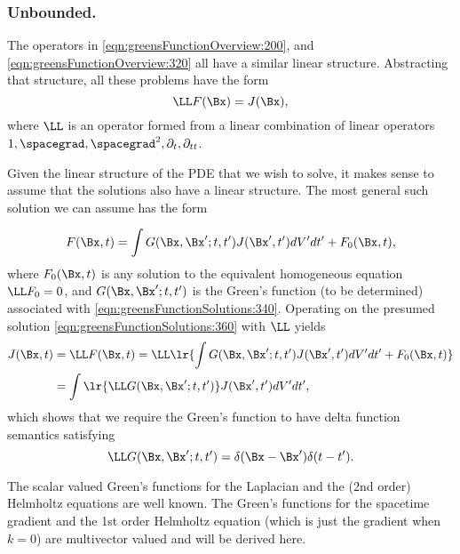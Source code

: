 %
%
\subsubsection{Unbounded.}

The operators in \cref{eqn:greensFunctionOverview:200}, and \cref{eqn:greensFunctionOverview:320} all have a similar linear structure.
Abstracting that structure, all these problems have the form
\begin{equation}\label{eqn:greensFunctionSolutions:340}
\LL F(\Bx) = J(\Bx),
\end{equation}
where \( \LL \) is an operator formed from a linear combination of linear operators \( 1, \spacegrad, \spacegrad^2, \partial_t, \partial_{tt} \).

Given the linear structure of the PDE that we wish to solve, it makes sense to assume that the solutions also have a linear structure.
The most general such solution we can assume has the form

\begin{equation}\label{eqn:greensFunctionSolutions:360}
F(\Bx, t) = \int G(\Bx, \Bx' ; t, t') J(\Bx', t') dV' dt' + F_0(\Bx, t),
\end{equation}
where \( F_0(\Bx, t) \) is any solution to the equivalent homogeneous equation \( \LL F_0 = 0 \), and \( G(\Bx, \Bx' ; t, t') \) is the Green's function (to be determined) associated with \cref{eqn:greensFunctionSolutions:340}.
Operating on the presumed solution
\cref{eqn:greensFunctionSolutions:360} with \( \LL \) yields
\begin{equation}\label{eqn:greensFunctionSolutions:380}
\begin{aligned}
J(\Bx, t)
&= \LL F(\Bx, t) = \LL\lr{ \int G(\Bx, \Bx' ; t, t') J(\Bx', t') dV' dt' + F_0(\Bx, t) } \\
&= \int \lr{ \LL G(\Bx, \Bx'; t, t') } J(\Bx', t') dV' dt',
\end{aligned}
\end{equation}
which shows that we require the Green's function to have delta function semantics satisfying
\begin{equation}\label{eqn:greensFunctionSolutions:400}
\LL G(\Bx, \Bx' ; t, t') = \delta(\Bx - \Bx') \delta(t - t').
\end{equation}

The scalar valued Green's functions for the Laplacian and the (2nd order) Helmholtz equations are well known.
The Green's functions for the spacetime gradient and the 1st order Helmholtz equation (which is just the gradient when \( k = 0 \)) are multivector valued and will be derived here.

